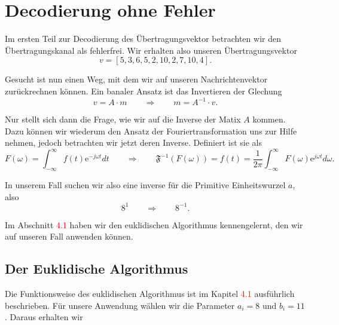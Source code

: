 %
%
%
\section{Decodierung ohne Fehler
\label{reedsolomon:section:decohnefehler}}
Im ersten Teil zur Decodierung des Übertragungsvektor betrachten wir den Übertragungskanal als fehlerfrei.
Wir erhalten also unseren Übertragungsvektor
\[
v = [5,3,6,5,2,10,2,7,10,4].
\]

Gesucht ist nun einen Weg, mit dem wir auf unseren Nachrichtenvektor zurückrechnen können.
Ein banaler Ansatz ist das Invertieren der Glechung
\[
v = A \cdot m \qquad \Rightarrow \qquad m = A^{-1} \cdot v.
\]

Nur stellt sich dann die Frage, wie wir auf die Inverse der Matix $A$ kommen.
Dazu können wir wiederum den Ansatz der Fouriertransformation uns zur Hilfe nehmen,
jedoch betrachten wir jetzt deren Inverse.
Definiert ist sie als
\[
F(\omega) = \int_{-\infty}^{\infty} f(t) \mathrm{e}^{-j\omega t} dt \qquad \Rightarrow \qquad \mathfrak{F}^{-1}(F(\omega)) = f(t) = \frac{1}{2 \pi} \int_{-\infty}^{\infty} F(\omega) \mathrm{e}^{j \omega t} d\omega.
\]

In unserem Fall suchen wir also eine inverse für die Primitive Einheitswurzel $a$, also
\[
8^1 \qquad \Rightarrow \qquad 8^{-1}.
\]

Im Abschnitt \textcolor{red}{4.1} haben wir den euklidischen Algorithmus kennengelernt, den wir auf unseren Fall anwenden können.

\subsection{Der Euklidische Algorithmus
\label{reedsolomon:subsection:eukAlgo}}

Die Funktionsweise des euklidischen Algorithmus ist im Kapitel \textcolor{red}{4.1} ausführlich beschrieben.
Für unsere Anwendung wählen wir die Parameter $a_i = 8$ und $b_i = 11$.
Daraus erhalten wir 

